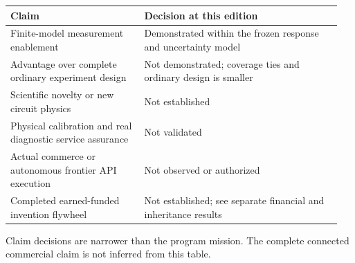 \documentclass[10pt,letterpaper]{article}
\begin{document}
\begingroup\small\setlength{\tabcolsep}{4pt}\renewcommand{\arraystretch}{1.18}
\begin{longtable}{>{\raggedright\arraybackslash}p{0.38\linewidth}>{\raggedright\arraybackslash}p{0.57\linewidth}}
\toprule \textbf{Claim} & \textbf{Decision at this edition}\\\midrule\endhead
Finite-model measurement enablement & Demonstrated within the frozen response and uncertainty model\\
Advantage over complete ordinary experiment design & Not demonstrated; coverage ties and ordinary design is smaller\\
Scientific novelty or new circuit physics & Not established\\
Physical calibration and real diagnostic service assurance & Not validated\\
Actual commerce or autonomous frontier API execution & Not observed or authorized\\
Completed earned-funded invention flywheel & Not established; see separate financial and inheritance results\\
\bottomrule\end{longtable}
{\footnotesize Claim decisions are narrower than the program mission. The complete connected commercial claim is not inferred from this table.\par}\endgroup
\end{document}
